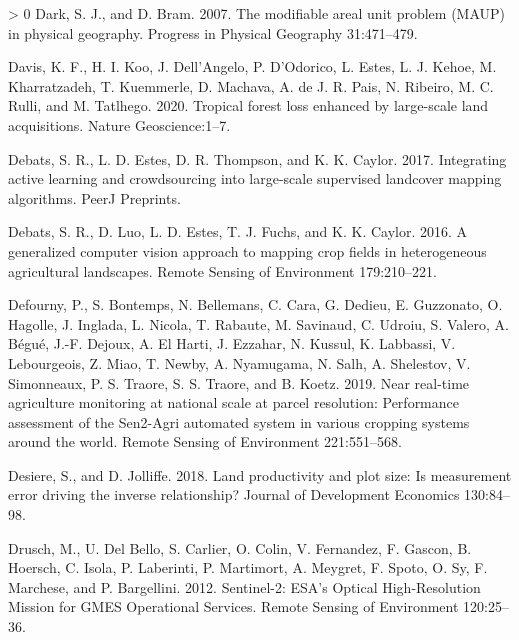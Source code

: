\documentclass[11pt,a4paper]{article}
\newlength{\cslhangindent}
\newenvironment{CSLReferences}[3] %
 {%
  \setlength{\parindent}{0pt}
  \ifodd #1 \everypar{\setlength{\hangindent}{\cslhangindent}}\ignorespaces\fi
  \ifnum #2 > 0
  \setlength{\parskip}{#2\baselineskip}
  \fi
 }%
 {}
\begin{document}
\begin{CSLReferences}{1}{0}
\leavevmode\hypertarget{ref-Darkmodifiablearealunit2007}{}%
Dark, S. J., and D. Bram. 2007. The modifiable areal unit problem
({MAUP}) in physical geography. Progress in Physical Geography
31:471--479.

\leavevmode\hypertarget{ref-davisTropicalForestLoss2020}{}%
Davis, K. F., H. I. Koo, J. Dell'Angelo, P. D'Odorico, L. Estes, L. J.
Kehoe, M. Kharratzadeh, T. Kuemmerle, D. Machava, A. de J. R. Pais, N.
Ribeiro, M. C. Rulli, and M. Tatlhego. 2020. Tropical forest loss
enhanced by large-scale land acquisitions. Nature Geoscience:1--7.

\leavevmode\hypertarget{ref-DebatsIntegratingactivelearning2017}{}%
Debats, S. R., L. D. Estes, D. R. Thompson, and K. K. Caylor. 2017.
Integrating active learning and crowdsourcing into large-scale
supervised landcover mapping algorithms. {PeerJ Preprints}.

\leavevmode\hypertarget{ref-Debatsgeneralizedcomputervision2016}{}%
Debats, S. R., D. Luo, L. D. Estes, T. J. Fuchs, and K. K. Caylor. 2016.
A generalized computer vision approach to mapping crop fields in
heterogeneous agricultural landscapes. Remote Sensing of Environment
179:210--221.

\leavevmode\hypertarget{ref-Defournyrealtimeagriculturemonitoring2019}{}%
Defourny, P., S. Bontemps, N. Bellemans, C. Cara, G. Dedieu, E.
Guzzonato, O. Hagolle, J. Inglada, L. Nicola, T. Rabaute, M. Savinaud,
C. Udroiu, S. Valero, A. Bégué, J.-F. Dejoux, A. El Harti, J. Ezzahar,
N. Kussul, K. Labbassi, V. Lebourgeois, Z. Miao, T. Newby, A. Nyamugama,
N. Salh, A. Shelestov, V. Simonneaux, P. S. Traore, S. S. Traore, and B.
Koetz. 2019. Near real-time agriculture monitoring at national scale at
parcel resolution: {Performance} assessment of the {Sen2}-{Agri}
automated system in various cropping systems around the world. Remote
Sensing of Environment 221:551--568.

\leavevmode\hypertarget{ref-desiereLandProductivityPlot2018}{}%
Desiere, S., and D. Jolliffe. 2018. Land productivity and plot size:
{Is} measurement error driving the inverse relationship? Journal of
Development Economics 130:84--98.

\leavevmode\hypertarget{ref-DruschSentinel2ESAOptical2012}{}%
Drusch, M., U. Del Bello, S. Carlier, O. Colin, V. Fernandez, F. Gascon,
B. Hoersch, C. Isola, P. Laberinti, P. Martimort, A. Meygret, F. Spoto,
O. Sy, F. Marchese, and P. Bargellini. 2012. Sentinel-2: {ESA}'s
{Optical High}-{Resolution Mission} for {GMES Operational Services}.
Remote Sensing of Environment 120:25--36.


\end{CSLReferences}
\end{document}
